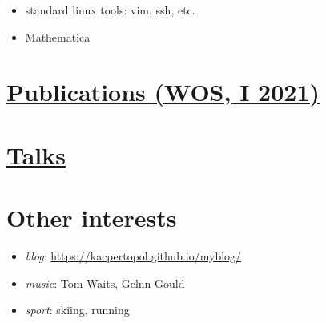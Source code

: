 \begin{itemize}
  \begin{itemize}
  \tightlist
  \item
    standard linux tools: vim, ssh, etc.
  \item
    Mathematica
  \end{itemize}
\end{itemize}

\hypertarget{publications-wos-i-2021}{%
\section{\texorpdfstring{\href{./0pl.html}{Publications (WOS, I
2021)}}{Publications (WOS, I 2021)}}\label{publications-wos-i-2021}}

\hypertarget{talks}{%
\section{\texorpdfstring{\href{./00pl.html}{Talks}}{Talks}}\label{talks}}

\hypertarget{other-interests}{%
\section{Other interests}\label{other-interests}}

\begin{itemize}
\tightlist
\item
  \emph{blog}: \url{https://kacpertopol.github.io/myblog/}
\item
  \emph{music}: Tom Waits, Gelnn Gould
\item
  \emph{sport}: skiing, running
\end{itemize}
